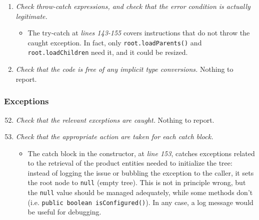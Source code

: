 \begin{enumerate}
			\item \textit{Check throw-catch expressions, and check that the error condition is actually legitimate.}
			\begin{itemize}
				\item The try-catch at \textit{lines 143-155} covers instructions that do not throw the caught exception. In fact, only \texttt{root.loadParents()} and \texttt{root.loadChildren} need it, and it could be resized.
			\end{itemize}

			\item \textit{Check that the code is free of any implicit type conversions.}\newline
			Nothing to report. %
		\end{enumerate}

	\subsubsection{Exceptions}
		\begin{enumerate}
			\setcounter{enumi}{51}
			\item \textit{Check that the relevant exceptions are caught.}\newline
			Nothing to report. %

			\item \textit{Check that the appropriate action are taken for each catch block.}
			\begin{itemize}
				\item The catch block in the constructor, at \textit{line 153}, catches exceptions related to the retrieval of the product entities needed to initialize the tree: instead of logging the issue or bubbling the exception to the caller, it sets the root node to \texttt{null} (empty tree). This is not in principle wrong, but the \texttt{null} value should be managed adequately, while some methods don't (i.e. \texttt{public boolean isConfigured()}). In any case, a log message would be useful for debugging.
			\end{itemize}
		\end{enumerate}

